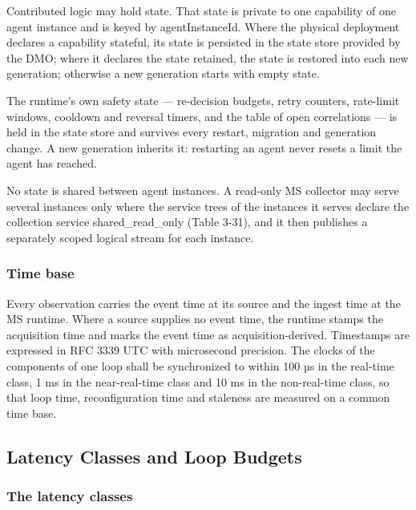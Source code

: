 Contributed logic may hold state. That state is private to one
capability of one agent instance and is keyed by agentInstanceId. Where
the physical deployment declares a capability stateful, its state is
persisted in the state store provided by the DMO; where it declares the
state retained, the state is restored into each new generation;
otherwise a new generation starts with empty state.

The runtime's own safety state --- re-decision budgets, retry counters,
rate-limit windows, cooldown and reversal timers, and the table of open
correlations --- is held in the state store and survives every restart,
migration and generation change. A new generation inherits it:
restarting an agent never resets a limit the agent has reached.

No state is shared between agent instances. A read-only MS collector may
serve several instances only where the service trees of the instances it
serves declare the collection service
shared\_\allowbreak{}read\_\allowbreak{}only (Table 3-31), and it then
publishes a separately scoped logical stream for each instance.

\hypertarget{time-base}{%
\subsubsection{Time base}\label{time-base}}

Every observation carries the event time at its source and the ingest
time at the MS runtime. Where a source supplies no event time, the
runtime stamps the acquisition time and marks the event time as
acquisition-derived. Timestamps are expressed in RFC 3339 UTC with
microsecond precision. The clocks of the components of one loop shall be
synchronized to within 100 µs in the real-time class, 1 ms in the
near-real-time class and 10 ms in the non-real-time class, so that loop
time, reconfiguration time and staleness are measured on a common time
base.

\hypertarget{latency-classes-and-loop-budgets}{%
\subsection{Latency Classes and Loop Budgets}\label{latency-classes-and-loop-budgets}}

\hypertarget{the-latency-classes}{%
\subsubsection{The latency classes}\label{the-latency-classes}}

